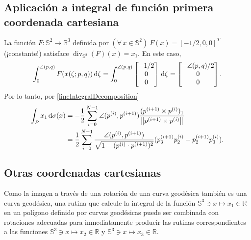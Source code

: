 \documentclass[reqno]{amsart}
\newcommand{\dd}[1][y]{\if#1y\,\fi{\mathrm d}} %
\newcommand{\norm}[2][y]{\if#1y\left\fi\lVert#2\if#1y\right\fi\rVert} %
\newcommand{\psp}[1]{\sp{(#1)}} %
\begin{document}
\subsection{Aplicación a integral de función primera coordenada cartesiana}
La función $F \colon \mathbb{S}^2 \to \mathbb{R}^3$ definida por $(\forall\,x \in\mathbb{S}^2)\ F(x) = [-1/2,0,0]^T$ (¡constante!) satisface $\operatorname{div}_{\mathbb{S}^2}(F)(x) = x_1$.
En este caso,
%
\begin{equation*}
\int_0^{\angle(p,q)} F(x(\zeta;p,q)) \dd \zeta
=\int_0^{\angle(p,q)} \begin{bmatrix} -1/2 \\ 0 \\ 0 \end{bmatrix} \dd \zeta
= \begin{bmatrix} -\angle(p,q)/2 \\ 0 \\ 0 \end{bmatrix}.
\end{equation*}
%
Por lo tanto, por \eqref{lineIntegralDecomposition}
%
\begin{equation*}
\begin{split}
\int_P x_1 \dd \sigma(x) & = -\frac{1}{2} \sum_{i=0}^{N-1} \angle(p\psp{i},p\psp{i+1}) \frac{(p\psp{i+1} \times p\psp{i})_1}{\norm{p\psp{i+1} \times p\psp{i}}}\\
& = \frac{1}{2} \sum_{i=0}^{N-1} \frac{\angle(p\psp{i},p\psp{i+1})}{\sqrt{1-(p\psp{i} \cdot p\psp{i+1})^2}} (p\psp{i+1}_3 p\psp{i}_2 - p\psp{i+1}_2 p\psp{i}_3).
\end{split}
\end{equation*}

\subsection{Otras coordenadas cartesianas}

Como la imagen a través de una rotación de una curva geodésica también es una curva geodésica, una rutina que calcule la integral de la función $\mathbb{S}^3 \ni x \mapsto x_1 \in \mathbb{R}$ en un polígono definido por curvas geodésicas puede ser combinada con rotaciones adecuadas para inmediatamente producir las rutinas correspondientes a las funciones $\mathbb{S}^3 \ni x \mapsto x_2 \in \mathbb{R}$ y $\mathbb{S}^3 \ni x \mapsto x_3 \in \mathbb{R}$.
\end{document}
